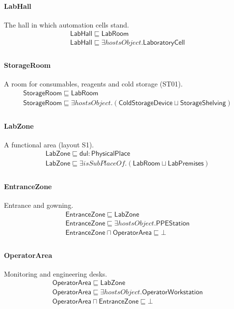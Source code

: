 \documentclass[10pt]{article}
\begin{document}
\paragraph{LabHall} The hall in which automation cells stand.
\[\begin{array}{l}
\mathsf{LabHall} \sqsubseteq  \mathsf{LabRoom} \\
\mathsf{LabHall} \sqsubseteq  \exists \mathit{hostsObject}.\mathsf{LaboratoryCell} \\
\end{array}\]
\paragraph{StorageRoom} A room for consumables, reagents and cold storage (ST01).
\[\begin{array}{l}
\mathsf{StorageRoom} \sqsubseteq  \mathsf{LabRoom} \\
\mathsf{StorageRoom} \sqsubseteq  \exists \mathit{hostsObject}.(\mathsf{ColdStorageDevice} \sqcup  \mathsf{StorageShelving}) \\
\end{array}\]
\paragraph{LabZone} A functional area (layout S1).
\[\begin{array}{l}
\mathsf{LabZone} \sqsubseteq  \mathsf{dul{:}PhysicalPlace} \\
\mathsf{LabZone} \sqsubseteq  \exists \mathit{isSubPlaceOf}.(\mathsf{LabRoom} \sqcup  \mathsf{LabPremises}) \\
\end{array}\]
\paragraph{EntranceZone} Entrance and gowning.
\[\begin{array}{l}
\mathsf{EntranceZone} \sqsubseteq  \mathsf{LabZone} \\
\mathsf{EntranceZone} \sqsubseteq  \exists \mathit{hostsObject}.\mathsf{PPEStation} \\
\mathsf{EntranceZone} \sqcap  \mathsf{OperatorArea} \sqsubseteq  \bot  \\
\end{array}\]
\paragraph{OperatorArea} Monitoring and engineering desks.
\[\begin{array}{l}
\mathsf{OperatorArea} \sqsubseteq  \mathsf{LabZone} \\
\mathsf{OperatorArea} \sqsubseteq  \exists \mathit{hostsObject}.\mathsf{OperatorWorkstation} \\
\mathsf{OperatorArea} \sqcap  \mathsf{EntranceZone} \sqsubseteq  \bot  \\
\end{array}\]
\end{document}
